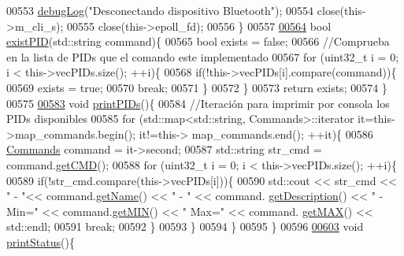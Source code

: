 \begin{DoxyCode}
{{{{{{{{{{{{{{00553         \hyperlink{debug_8hpp_a55f41cf7b0585224496de3d7adbc101c}{debugLog}(\textcolor{stringliteral}{"Desconectando dispositivo Bluetooth"});
00554         close(this->m\_cli\_s);
00555         close(this->epoll\_fd);
00556     \}
00557 
\hyperlink{classObd_aeff55ecb0a0a4278a22f20db3d2e17e3}{00564}     \textcolor{keywordtype}{bool} \hyperlink{classObd_aeff55ecb0a0a4278a22f20db3d2e17e3}{existPID}(std::string command)\{
00565         \textcolor{keywordtype}{bool} exists = \textcolor{keyword}{false};
00566         \textcolor{comment}{//Comprueba en la lista de PIDs que el comando este implementado}
00567         \textcolor{keywordflow}{for} (uint32\_t i = 0; i < this->vecPIDs.size(); ++i)\{
00568             \textcolor{keywordflow}{if}(!this->vecPIDs[i].compare(command))\{
00569                 exists = \textcolor{keyword}{true};
00570                 \textcolor{keywordflow}{break};
00571             \}
00572         \}
00573         \textcolor{keywordflow}{return} exists;
00574     \}
00575     
\hyperlink{classObd_abf7e84f45236ea1c78c762ac895c532c}{00583}     \textcolor{keywordtype}{void} \hyperlink{classObd_abf7e84f45236ea1c78c762ac895c532c}{printPIDs}()\{
00584         \textcolor{comment}{//Iteración para imprimir por consola los PIDs disponibles}
00585         \textcolor{keywordflow}{for} (std::map<std::string, Commands>::iterator it=this->map\_commands.begin(); it!=this->
      map\_commands.end(); ++it)\{
00586             \hyperlink{classCommands}{Commands} command = it->second;
00587             std::string str\_cmd = command.\hyperlink{classCommands_a9aee21ab91fdfc8e9daa59e1e8f20b73}{getCMD}();
00588             \textcolor{keywordflow}{for} (uint32\_t i = 0; i < this->vecPIDs.size(); ++i)\{
00589                 \textcolor{keywordflow}{if}(!str\_cmd.compare(this->vecPIDs[i]))\{
00590                     std::cout << str\_cmd << \textcolor{stringliteral}{" - "}<< command.\hyperlink{classCommands_adf3d8a96310b1f4e57a6ecf0f2f153ea}{getName}() << \textcolor{stringliteral}{" - "} << command.
      \hyperlink{classCommands_ad82fe7dfcf1908423bdb59d048020e26}{getDescription}() << \textcolor{stringliteral}{" - Min="} << command.\hyperlink{classCommands_af0a1e2ea65b5a57997c721a8d77a1013}{getMIN}() << \textcolor{stringliteral}{" Max="} << command.
      \hyperlink{classCommands_afbad1051313d0cdecba276384cb7fc6b}{getMAX}() << std::endl;
00591                     \textcolor{keywordflow}{break};
00592                 \}
00593             \}
00594         \}
00595     \}
00596 
\hyperlink{classObd_a0938bfdd6d05795e826a239cc0f29f32}{00603}     \textcolor{keywordtype}{void} \hyperlink{classObd_a0938bfdd6d05795e826a239cc0f29f32}{printStatus}()\{
}}}}}}}}}}}}}}
\end{DoxyCode}
